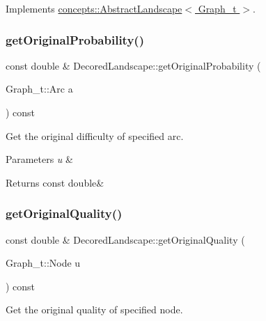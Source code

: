 Implements \hyperlink{classconcepts_1_1_abstract_landscape_a7ed478b62e37cad9a22bed3adedf07c5}{concepts\+::\+Abstract\+Landscape$<$ Graph\+\_\+t $>$}.

\mbox{\label{class_decored_landscape_af45ece8a6787d42c0d60c90de913b9f5}} 
\subsubsection{\texorpdfstring{get\+Original\+Probability()}{getOriginalProbability()}}
{\footnotesize\ttfamily const double \& Decored\+Landscape\+::get\+Original\+Probability (\begin{DoxyParamCaption}\item[{Graph\+\_\+t\+::\+Arc}]{a }\end{DoxyParamCaption}) const}



Get the original difficulty of specified arc. 


\begin{DoxyParams}{Parameters}
{\em u} & \\
\hline
\end{DoxyParams}
\begin{DoxyReturn}{Returns}
const double\& 
\end{DoxyReturn}
\mbox{\label{class_decored_landscape_a136c0034f2953fd59332d73b6eb17b19}} 
\subsubsection{\texorpdfstring{get\+Original\+Quality()}{getOriginalQuality()}}
{\footnotesize\ttfamily const double \& Decored\+Landscape\+::get\+Original\+Quality (\begin{DoxyParamCaption}\item[{Graph\+\_\+t\+::\+Node}]{u }\end{DoxyParamCaption}) const}



Get the original quality of specified node. 



